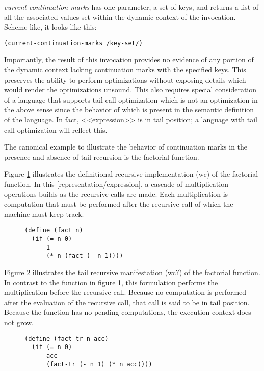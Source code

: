 \documentclass[ms]{byuprop}
\begin{document}
\emph{current-continuation-marks} has one parameter, a set of keys, and returns a list of
all the associated values set within the dynamic context of the invocation. Scheme-like,
it looks like this:

\begin{verbatim}
(current-continuation-marks /key-set/)
\end{verbatim}

Importantly, the result of this invocation provides no evidence of any portion of the
dynamic context lacking continuation marks with the specified keys. This preserves the
ability to perform optimizations without exposing details which would render the
optimizations unsound. This also requires special consideration of a language that
supports tail call optimization which is not an optimization in the above sense since the
behavior of which is present in the semantic definition of the language. In fact, 
<<expression>> is in tail position; a language with tail call optimization will reflect 
this.

The canonical example to illustrate the behavior of continuation marks in the presence and
absence of tail recursion is the factorial function.

Figure \ref{fac-rec} illustrates the definitional recursive implementation (wc) of the
factorial function. In this [representation/expression], a cascade of multiplication
operations builds as the recursive calls are made. Each multiplication is computation that
must be performed after the recursive call of which the machine must keep track.


\begin{figure}
\label{fac-rec}
\begin{verbatim}
(define (fact n)
  (if (= n 0)
      1
      (* n (fact (- n 1))))
\end{verbatim}
\end{figure}

Figure \ref{fac-tail-rec} illustrates the tail recursive manifestation (wc?) of the
factorial function. In contrast to the function in figure \ref{fac-rec}, this formulation
performs the multiplication before the recursive call. Because no computation is performed
after the evaluation of the recursive call, that call is said to be in tail position.
Because the function has no pending computations, the execution context does not grow.

\begin{figure}
\label{fac-tail-rec}
\begin{verbatim}
(define (fact-tr n acc)
  (if (= n 0)
      acc
      (fact-tr (- n 1) (* n acc))))
\end{verbatim}
\end{figure}
\end{document}
